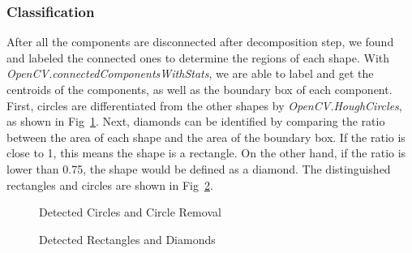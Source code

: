 \documentclass[conference,twocolumn]{IEEEtran}
\begin{document}
\subsubsection{Classification}
    
    After all the components are disconnected after decomposition step, we found and labeled the connected ones to determine the regions of each shape. With \emph{OpenCV.connectedComponentsWithStats}, we are able to label and get the centroids of the components, as well as the boundary box of each component. First, circles are differentiated from the other shapes by \emph{OpenCV.HoughCircles}, as shown in Fig~\ref{fig:circ}. Next, diamonds can be identified by comparing the ratio between the area of each shape and the area of the boundary box. If the ratio is close to 1, this means the shape is a rectangle. On the other hand, if the ratio is lower than 0.75, the shape would be defined as a diamond. The distinguished rectangles and circles are shown in Fig~\ref{fig:rectNdiam}.
    
\begin{figure}[!htbp]
    \centering
    \caption{Detected Circles and Circle Removal}
    \label{fig:circ}
\end{figure}

\begin{figure}[!htbp]
    \centering
    \caption{Detected Rectangles and Diamonds}
    \label{fig:rectNdiam}
\end{figure}
    
\end{document}
